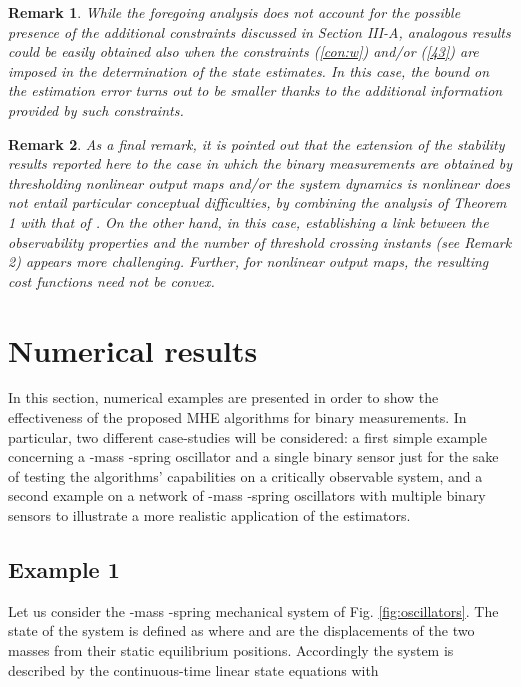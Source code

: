 \documentclass[11pt,journal,onecolumn]{IEEEtran}
\newtheorem{remark}{Remark}
\begin{document}
\begin{remark}
While the foregoing analysis does not account for the possible presence of the additional constraints discussed in Section III-A, analogous results could be easily obtained also when the constraints (\ref{con:w}) and/or (\ref{43}) are imposed in the determination of the state estimates. In this case, the bound on the estimation error turns out to be smaller thanks to the additional information provided by such constraints.
\end{remark}

\begin{remark}
As a final remark, it is pointed out that the extension of the stability results reported here to the case in which the binary measurements are obtained by thresholding nonlinear output maps and/or the system dynamics is nonlinear does not entail particular conceptual difficulties, by combining the analysis of Theorem 1 with that of \cite{NLMHE,AlBaBaZavCDC10}. On the other hand, in this case, establishing a link between the observability properties and the number of threshold crossing instants (see Remark 2) appears more challenging. Further, for nonlinear output maps, the resulting cost functions need not be convex.
\end{remark}

\section{Numerical results}

In this section, numerical examples are presented in order to show the effectiveness of the proposed MHE algorithms for binary measurements.
In particular, two different case-studies will be considered: a first simple example concerning a -mass -spring oscillator and a single binary sensor just for the sake of testing the algorithms' capabilities on a critically observable system, and a second example on a network of -mass -spring oscillators with multiple binary sensors to illustrate a more realistic application of the estimators.

\subsection*{Example 1}

Let us consider the -mass -spring mechanical system of Fig. \ref{fig:oscillators}.
The state of the system is defined as  where  and  are the displacements of the two masses from their static equilibrium positions.
Accordingly the system is described by the continuous-time linear state equations  with
\end{document}
